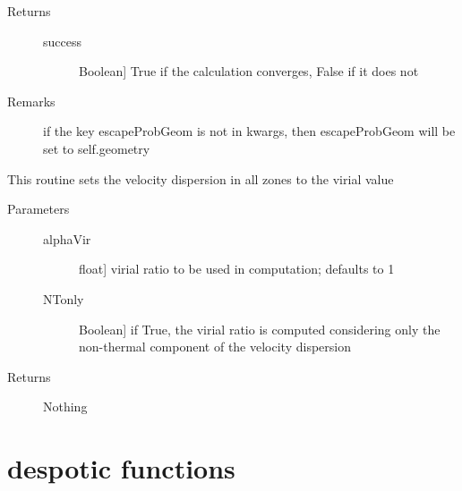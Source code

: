 \documentclass[letterpaper,10pt,english]{sphinxmanual}
\begin{document}
\begin{fulllineitems}
\begin{fulllineitems}
\begin{description}
\begin{description}
\end{description}

\item[{Returns}] \leavevmode\begin{description}
\item[{success}] \leavevmode{[}Boolean{]}
True if the calculation converges, False if it does not

\end{description}

\item[{Remarks}] \leavevmode
if the key escapeProbGeom is not in kwargs, then
escapeProbGeom will be set to self.geometry

\end{description}

\end{fulllineitems}


\begin{fulllineitems}
\label{fulldoc:despotic.zonedcloud.setVirial}
This routine sets the velocity dispersion in all zones to the
virial value
\begin{description}
\item[{Parameters}] \leavevmode\begin{description}
\item[{alphaVir}] \leavevmode{[}float{]}
virial ratio to be used in computation; defaults to 1

\item[{NTonly}] \leavevmode{[}Boolean{]}
if True, the virial ratio is computed considering only the
non-thermal component of the velocity dispersion

\end{description}

\item[{Returns}] \leavevmode
Nothing

\end{description}

\end{fulllineitems}


\end{fulllineitems}



\section{despotic functions}
\label{fulldoc:despotic-functions}
\end{document}
